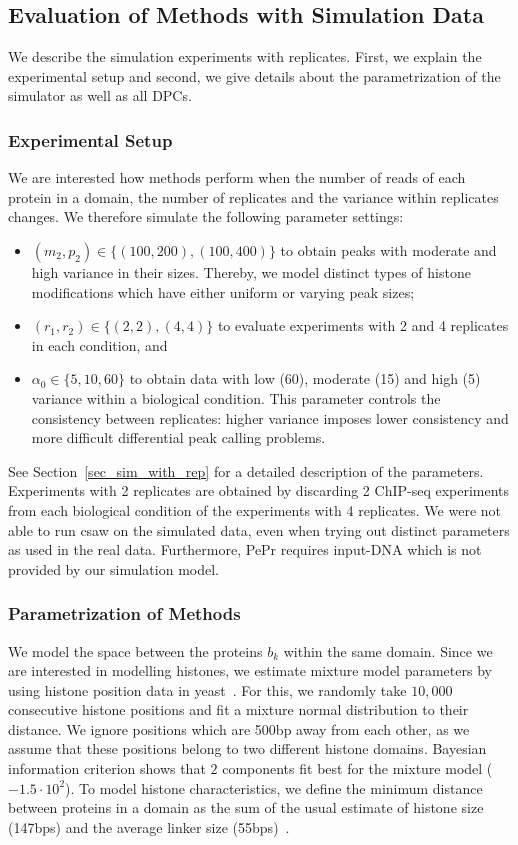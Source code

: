 \subsection{Evaluation of Methods with Simulation Data}
We describe the simulation experiments with replicates. 
First, we explain the experimental setup and second, we give details about the parametrization of the simulator as well as all DPCs.

\subsubsection{Experimental Setup}
We are interested how methods perform when the number of reads of each protein in a domain, the number of replicates and the variance within replicates changes. 
We therefore simulate the following parameter settings: 
\begin{itemize}
 \item $(m_2, p_2) \in \{(100, 200), (100, 400)\}$ to obtain peaks with moderate and high variance in their sizes. 
 Thereby, we model distinct types of histone modifications which have either uniform or varying peak sizes;
 \item $(r_1, r_2) \in \{(2,2), (4,4)\}$  to evaluate experiments with 2 and 4 replicates in each condition, and 
 \item $\alpha_0 \in \{5, 10, 60\}$ to obtain data with low (60), moderate (15) and high (5) variance within a biological condition.
 This parameter controls the consistency between replicates: higher variance imposes lower consistency and more difficult differential peak calling problems.
\end{itemize}
See Section~\ref{sec_sim_with_rep} for a detailed description of the parameters.
Experiments with 2 replicates are obtained by discarding 2 ChIP-seq experiments from each biological condition of the experiments with 4 replicates. 
We were not able to run csaw on the simulated data, even when trying out distinct parameters as used in the real data.
Furthermore, PePr requires input-DNA which is not provided by our simulation model.

\subsubsection{Parametrization of Methods}
We model the space between the proteins $b_k$ within the same domain. 
Since we are interested in modelling histones, we estimate mixture model parameters by using histone position data in yeast~\citep{Assaf2010}.
For this, we randomly take $10,000$ consecutive histone positions and fit a mixture normal distribution to their distance.
We ignore positions which are 500bp away from each other, as we assume that these positions belong to two different histone domains.
Bayesian information criterion shows that $2$ components fit best for the mixture model ($-1.5 \cdot 10^2$).
To model histone characteristics, we define the minimum distance between proteins in a domain as the sum of the usual estimate of histone size (147bps) and the average linker size (55bps)~\citep{Szerlong2011}.

